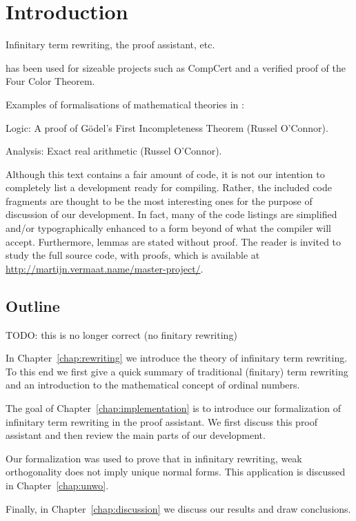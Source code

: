 \chapter{Introduction}
\setcounter{page}{1}

Infinitary term rewriting, the \Coq proof assistant, etc.

\Coq has been used for sizeable projects such as CompCert and a verified proof
of the Four Color Theorem.

Examples of formalisations of mathematical theories in \Coq:
\begin{compactenum}
\item Logic: A proof of G\"odel's First Incompleteness Theorem (Russel
  O'Connor).
\item Analysis: Exact real arithmetic (Russel O'Connor).
\end{compactenum}

Although this text contains a fair amount of \Coq code, it is not our
intention to completely list a development ready for compiling. Rather, the
included code fragments are thought to be the most interesting ones for the
purpose of discussion of our development. In fact, many of the code listings
are simplified and/or typographically enhanced to a form beyond of what the
\Coq compiler will accept. Furthermore, lemmas are stated without proof. The
reader is invited to study the full source code, with proofs, which is
available at \url{http://martijn.vermaat.name/master-project/}.


\section*{Outline}

TODO: this is no longer correct (no finitary rewriting)

In Chapter~\ref{chap:rewriting} we introduce the theory of infinitary term
rewriting. To this end we first give a quick summary of traditional (finitary)
term rewriting and an introduction to the mathematical concept of ordinal
numbers.

The goal of Chapter~\ref{chap:implementation} is to introduce our formalization
of infinitary term rewriting in the \Coq proof assistant. We first discuss this
proof assistant and then review the main parts of our development.

Our formalization was used to prove that in infinitary rewriting, weak
orthogonality does not imply unique normal forms. This application is
discussed in Chapter~\ref{chap:unwo}.

Finally, in Chapter~\ref{chap:discussion} we discuss our results and draw
conclusions.

